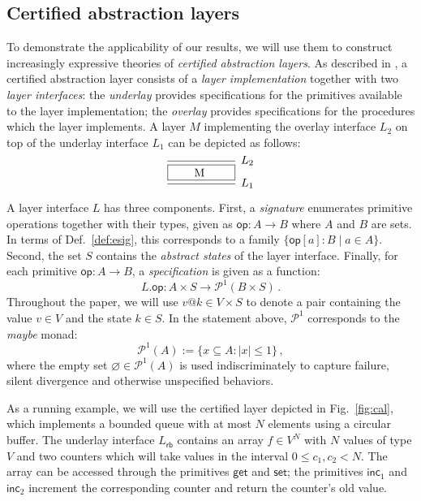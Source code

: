 \documentclass[sigplan,screen]{acmart}
\newcommand{\kw}[1]{\ensuremath{ \mathsf{#1} }}
\begin{document}

\subsection{Certified abstraction layers} %

To demonstrate the applicability of our results,
we will use them to construct
increasingly expressive theories of
\emph{certified abstraction layers}.
As described in \cite{popl15},
a certified abstraction layer
consists of a \emph{layer implementation} together with
two \emph{layer interfaces}:
the \emph{underlay} provides specifications for
the primitives available to the layer implementation;
the \emph{overlay} provides specifications for
the procedures which the layer implements.
A layer $M$ implementing the overlay interface $L_2$
on top of the underlay interface $L_1$ can be depicted as follows:
\[
  \begin{prooftree}
    \infer0[$L_2$]{\fbox{\qquad M \qquad}}
    \infer1[$L_1$]{}
  \end{prooftree}
\]

A layer interface $L$ has three components.
First, a \emph{signature} enumerates
primitive operations together with their types,
given as $\kw{op} : A \rightarrow B$
where $A$ and $B$ are sets.
In terms of Def.~\ref{def:esig},
this corresponds to a family $\{ \kw{op}[a] : B \mid a \in A \}$.
Second,
the set $S$ contains the \emph{abstract states} of the layer interface.
Finally, for each primitive
$\kw{op} : A \rightarrow B$,
a \emph{specification}
is given as a function:
\[
  L.\kw{op} : A \times S \rightarrow \mathcal{P}^1(B \times S) \,.
\]
Throughout the paper,
we will use $v@k \in V \times S$ to denote a pair
containing the value $v \in V$ and the state $k \in S$.
In the statement above,
$\mathcal{P}^1$ corresponds to the \emph{maybe} monad:
\[
  \mathcal{P}^1(A) := \{ x \subseteq A : |x| \le 1 \} \,,
\]
where the empty set $\varnothing \in \mathcal{P}^1(A)$
is used indiscriminately to capture
failure, silent divergence and otherwise unspecified behaviors.

As a running example,
we will use the certified layer
depicted in Fig.~\ref{fig:cal},
which implements a bounded queue with at most $N$ elements
using a circular buffer.
The underlay interface $L_\kw{rb}$
contains an array $f \in V^N$
with $N$ values of type $V$ and two counters
which will take values in the interval $0 \le c_1, c_2 < N$.
The array can be accessed through the primitives
$\kw{get}$ and $\kw{set}$;
the primitives $\kw{inc}_1$ and $\kw{inc}_2$
increment the corresponding counter
and return the counter's old value.
\end{document}
